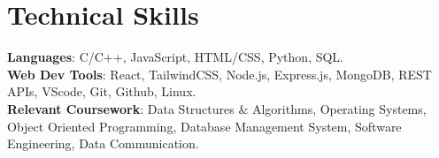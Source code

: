 \documentclass[letterpaper,11pt]{article}
\makeatletter
\newcommand{\resumeSubheading}[4]{
  \vspace{-5pt}\item
    \begin{tabular*}{1.0\textwidth}[t]{l@{\extracolsep{\fill}}r}
      \textbf{#1} & \textbf{\small #2} \\
      \textit{\small#3} & \textit{\small #4} \\
    \end{tabular*}\vspace{-5pt}
}
\newcommand{\resumeSubHeadingListStart}{\begin{itemize}[leftmargin=0.0in, label={}]}
\newcommand{\resumeItemListStart}{\begin{itemize}}
\makeatother
\begin{document}
\section{\textbf{Technical Skills}}
 \begin{itemize}[leftmargin=0.00in, label={}]
    \small{\item{
     \textbf{Languages}{: C/C++, JavaScript, HTML/CSS, Python, SQL. } \\ 
     \textbf{Web Dev Tools}{: React, TailwindCSS, Node.js, Express.js, MongoDB, REST APIs, VScode, Git, Github, Linux. } \\
     \textbf{Relevant Coursework}{: Data Structures \& Algorithms, Operating Systems, Object Oriented Programming, Database Management System, Software Engineering, Data Communication. } \\ 
    }}
 \end{itemize}
 
 \vspace{-12pt}

\end{document}
